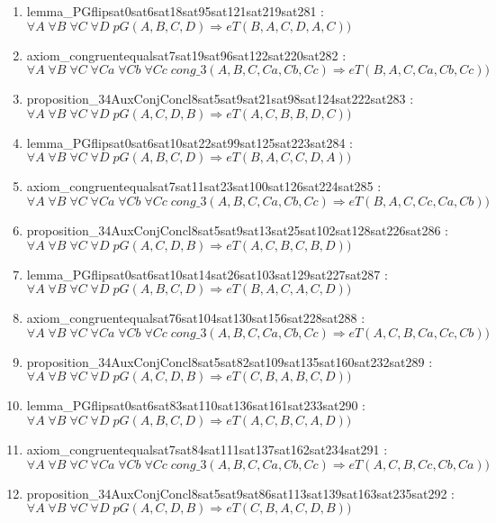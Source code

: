 \documentclass{article}
\begin{document}
\begin{enumerate}
\item lemma\_PGflipsat0sat6sat18sat95sat121sat219sat281 : $\forall A\;\forall B\;\forall C\;\forall D\;pG(A, B, C, D) \Rightarrow eT(B, A, C, D, A, C))$
\item axiom\_congruentequalsat7sat19sat96sat122sat220sat282 : $\forall A\;\forall B\;\forall C\;\forall Ca\;\forall Cb\;\forall Cc\;cong\_3(A, B, C, Ca, Cb, Cc) \Rightarrow eT(B, A, C, Ca, Cb, Cc))$
\item proposition\_34AuxConjConcl8sat5sat9sat21sat98sat124sat222sat283 : $\forall A\;\forall B\;\forall C\;\forall D\;pG(A, C, D, B) \Rightarrow eT(A, C, B, B, D, C))$
\item lemma\_PGflipsat0sat6sat10sat22sat99sat125sat223sat284 : $\forall A\;\forall B\;\forall C\;\forall D\;pG(A, B, C, D) \Rightarrow eT(B, A, C, C, D, A))$
\item axiom\_congruentequalsat7sat11sat23sat100sat126sat224sat285 : $\forall A\;\forall B\;\forall C\;\forall Ca\;\forall Cb\;\forall Cc\;cong\_3(A, B, C, Ca, Cb, Cc) \Rightarrow eT(B, A, C, Cc, Ca, Cb))$
\item proposition\_34AuxConjConcl8sat5sat9sat13sat25sat102sat128sat226sat286 : $\forall A\;\forall B\;\forall C\;\forall D\;pG(A, C, D, B) \Rightarrow eT(A, C, B, C, B, D))$
\item lemma\_PGflipsat0sat6sat10sat14sat26sat103sat129sat227sat287 : $\forall A\;\forall B\;\forall C\;\forall D\;pG(A, B, C, D) \Rightarrow eT(B, A, C, A, C, D))$
\item axiom\_congruentequalsat76sat104sat130sat156sat228sat288 : $\forall A\;\forall B\;\forall C\;\forall Ca\;\forall Cb\;\forall Cc\;cong\_3(A, B, C, Ca, Cb, Cc) \Rightarrow eT(A, C, B, Ca, Cc, Cb))$
\item proposition\_34AuxConjConcl8sat5sat82sat109sat135sat160sat232sat289 : $\forall A\;\forall B\;\forall C\;\forall D\;pG(A, C, D, B) \Rightarrow eT(C, B, A, B, C, D))$
\item lemma\_PGflipsat0sat6sat83sat110sat136sat161sat233sat290 : $\forall A\;\forall B\;\forall C\;\forall D\;pG(A, B, C, D) \Rightarrow eT(A, C, B, C, A, D))$
\item axiom\_congruentequalsat7sat84sat111sat137sat162sat234sat291 : $\forall A\;\forall B\;\forall C\;\forall Ca\;\forall Cb\;\forall Cc\;cong\_3(A, B, C, Ca, Cb, Cc) \Rightarrow eT(A, C, B, Cc, Cb, Ca))$
\item proposition\_34AuxConjConcl8sat5sat9sat86sat113sat139sat163sat235sat292 : $\forall A\;\forall B\;\forall C\;\forall D\;pG(A, C, D, B) \Rightarrow eT(C, B, A, C, D, B))$

\end{enumerate}
\end{document}
